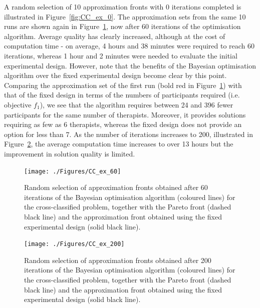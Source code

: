 \documentclass{article} %
\begin{document}
A random selection of 10 approximation fronts with 0 iterations completed is illustrated in Figure~\ref{fig:CC_ex_0}. The approximation sets from the same 10 runs are shown again in Figure~\ref{fig:CC_ex_60}, now after 60 iterations of the optimisation algorithm. Average quality has clearly increased, although at the cost of computation time - on average, 4 hours and 38 minutes were required to reach 60 iterations, whereas 1 hour and 2 minutes were needed to evaluate the initial experimental design. However, note that the benefits of the Bayesian optimisation algorithm over the fixed experimental design become clear by this point. Comparing the approximation set of the first run (bold red in Figure~\ref{fig:CC_ex_60}) with that of the fixed design in terms of the numbers of participants required (i.e. objective $f_{1}$), we see that the algorithm requires between 24 and 396 fewer participants for the same number of therapists. Moreover, it provides solutions requiring as few as 6 therapists, whereas the fixed design does not provide an option for less than 7. As the number of iterations increases to 200, illustrated in Figure~\ref{fig:CC_ex_200}, the average computation time increases to over 13 hours but the improvement in solution quality is limited.

\begin{figure}
\centering
\texttt{[image: ./Figures/CC\_ex\_60]}
\caption{Random selection of approximation fronts obtained after 60 iterations of the Bayesian optimisation algorithm (coloured lines) for the cross-classified problem, together with the Pareto front (dashed black line) and the approximation front obtained using the fixed experimental design (solid black line).}
\label{fig:CC_ex_60}
\end{figure}

\begin{figure}
\centering
\texttt{[image: ./Figures/CC\_ex\_200]}
\caption{Random selection of approximation fronts obtained after 200 iterations of the Bayesian optimisation algorithm (coloured lines) for the cross-classified problem, together with the Pareto front (dashed black line) and the approximation front obtained using the fixed experimental design (solid black line).}
\label{fig:CC_ex_200}
\end{figure}

\end{document}
